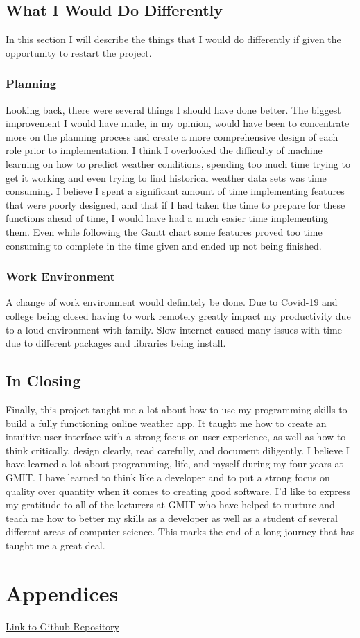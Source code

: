 \section{What I Would Do Differently}
In this section I will describe the things that I would do differently if given the opportunity to restart the project. 

\subsection{Planning}
Looking back, there were several things I should have done better. The biggest improvement I would have made, in my opinion, would have been to concentrate more on the planning process and create a more comprehensive design of each role prior to implementation. I think I overlooked the difficulty of machine learning on how to predict weather conditions, spending too much time trying to get it working and even trying to find historical weather data sets was time consuming. I believe I spent a significant amount of time implementing features that were poorly designed, and that if I had taken the time to prepare for these functions ahead of time, I would have had a much easier time implementing them. Even while following the Gantt chart some features proved too time consuming to complete in the time given and ended up not being finished.

\subsection{Work Environment}
A change of work environment would definitely be done. Due to Covid-19 and college being closed having to work remotely greatly impact my productivity due to a loud environment with family. Slow internet caused many issues with time due to different packages and libraries being install. 

\section{In Closing}
Finally, this project taught me a lot about how to use my programming skills to build a fully functioning online weather app. It taught me how to create an intuitive user interface with a strong focus on user experience, as well as how to think critically, design clearly, read carefully, and document diligently. I believe I have learned a lot about programming, life, and myself during my four years at GMIT. I have learned to think like a developer and to put a strong focus on quality over quantity when it comes to creating good software. I'd like to express my gratitude to all of the lecturers at GMIT who have helped to nurture and teach me how to better my skills as a developer as well as a student of several different areas of computer science.
This marks the end of a long journey that has taught me a great deal.


\chapter{Appendices}
\href{https://github.com/MarkReillyGMIT/AppliedProject}{Link to Github Repository}

